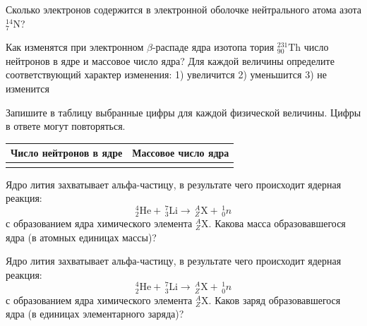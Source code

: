 \begin{taskbasic}[code={\label{task:atomic_electrons_nitrogen}}]
Сколько электронов содержится в электронной оболочке нейтрального атома азота $^{14}_{7}\text{N}$?

\end{taskbasic}

\begin{taskbasic}[code={\label{task:nuclear_beta_neutrons_mass}}]
Как изменятся при электронном $\beta$-распаде ядра изотопа тория $^{231}_{90}\text{Th}$ число нейтронов в ядре и массовое число ядра? Для каждой величины определите соответствующий характер изменения:
1) увеличится
2) уменьшится
3) не изменится

Запишите в таблицу выбранные цифры для каждой физической величины. Цифры в ответе могут повторяться.

\nopagebreak\smallskip
\begin{center}
\small
\begin{tabular}{|c|c|}
\hline
Число нейтронов в ядре & Массовое число ядра \\ \hline
 & \\ \hline
\end{tabular}
\end{center}

\end{taskbasic}

\begin{taskbasic}[code={\label{task:nuclear_reaction_lithium_alpha_mass}}]
Ядро лития захватывает альфа-частицу, в результате чего происходит ядерная реакция:
\[
^4_2\text{He} + \,^7_3\text{Li} \to \,^A_Z\text{X} + \,^1_0 n
\]
с образованием ядра химического элемента $^A_Z\text{X}$. Какова масса образовавшегося ядра (в атомных единицах массы)?

\end{taskbasic}

\begin{taskbasic}[code={\label{task:nuclear_reaction_lithium_alpha_charge}}]
Ядро лития захватывает альфа-частицу, в результате чего происходит ядерная реакция:
\[
^4_2\text{He} + \,^7_3\text{Li} \to \,^A_Z\text{X} + \,^1_0 n
\]
с образованием ядра химического элемента $^A_Z\text{X}$. Каков заряд образовавшегося ядра (в единицах элементарного заряда)?

\end{taskbasic}

